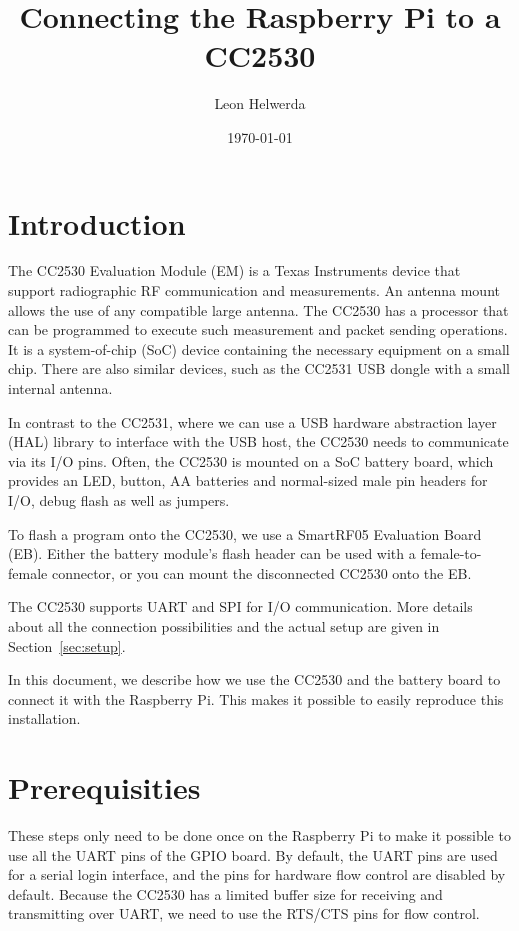 \documentclass{article}
\begin{document}
\title{Connecting the Raspberry Pi to a CC2530}
\author{Leon Helwerda}
\date{\today}

\maketitle

\section{Introduction}
The CC2530 Evaluation Module (EM) is a Texas Instruments device that support 
radiographic RF communication and measurements. An antenna mount allows the use 
of any compatible large antenna. The CC2530 has a processor that can be 
programmed to execute such measurement and packet sending operations. It is 
a system-of-chip (SoC) device containing the necessary equipment on a small 
chip. There are also similar devices, such as the CC2531 USB dongle with 
a small internal antenna.

In contrast to the CC2531, where we can use a USB hardware abstraction layer 
(HAL) library to interface with the USB host, the CC2530 needs to communicate 
via its I/O pins. Often, the CC2530 is mounted on a SoC battery board, which 
provides an LED, button, AA batteries and normal-sized male pin headers for 
I/O, debug flash as well as jumpers.

To flash a program onto the CC2530, we use a SmartRF05 Evaluation Board (EB). 
Either the battery module's flash header can be used with a female-to-female 
connector, or you can mount the disconnected CC2530 onto the EB.

The CC2530 supports UART and SPI for I/O communication. More details about all 
the connection possibilities and the actual setup are given in 
Section~\ref{sec:setup}.

In this document, we describe how we use the CC2530 and the battery board to 
connect it with the Raspberry Pi. This makes it possible to easily reproduce 
this installation.

\section{Prerequisities}

These steps only need to be done once on the Raspberry Pi to make it possible 
to use all the UART pins of the GPIO board. By default, the UART pins are used 
for a serial login interface, and the pins for hardware flow control are 
disabled by default. Because the CC2530 has a limited buffer size for receiving 
and transmitting over UART, we need to use the RTS/CTS pins for flow control.
\end{document}
